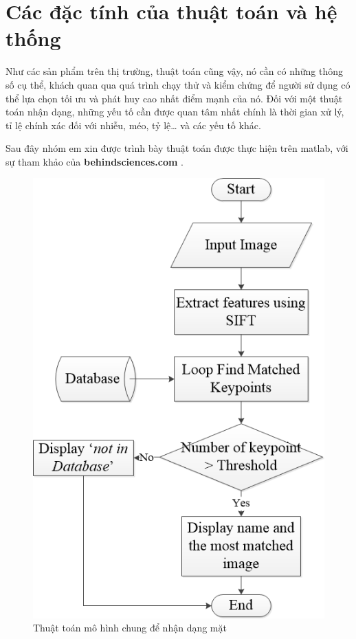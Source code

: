 \documentclass[conference]{IEEEtran}
\begin{document}
\medskip
\section{Các đặc tính của thuật toán và hệ thống}
\label{Sec:Cacdactinh}
Như các sản phẩm trên thị trường, thuật toán cũng vậy, nó cần có những thông số cụ thể, khách quan qua quá trình chạy thử và kiểm chứng để người sử dụng có thể lựa chọn tối ưu và phát huy cao nhất điểm mạnh của nó. Đối với một thuật toán nhận dạng, những yếu tố cần được quan tâm nhất chính là thời gian xử lý, tỉ lệ chính xác đối với nhiễu, méo, tỷ lệ… và các yếu tố khác.

Sau đây nhóm em xin được trình bày thuật toán được thực hiện trên matlab, với sự tham khảo của \textbf{behindsciences.com} \cite{CodeMatlab}.

\begin{figure}
  \includegraphics[width=\linewidth]{thuatoan}
  \caption{Thuật toán mô hình chung để nhận dạng mặt}
  \label{fig:thuatoan}
\end{figure}
\end{document}
